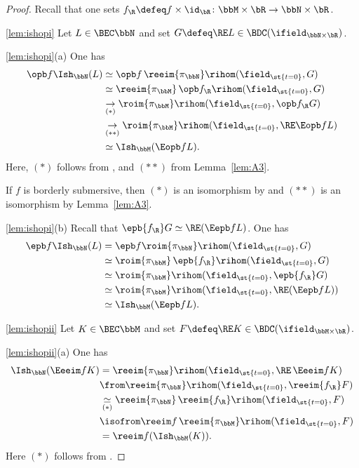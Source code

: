 \begin{proof}
Recall that one sets $f_\R \defeq f\times\id_\bR\colon \bbM\times\bR\to \bbN\times\bR$.

\eqref{lem:ishopi} Let $L\in\BEC\bbN$ and set $G\defeq\RE L\in\BDC(\ifield_{\bbN\times\bR})$.

\eqref{lem:ishopi}(a) One has
\begin{align*}
\opb f \Ish_{\bbN}(L)
&\simeq \opb f \,\reeim{{\pi_\bbN}} \rihom(\field_{\st{t=0}},G) \\
&\simeq\reeim{{\pi_\bbM}} \,\opb f_\R \rihom(\field_{\st{t=0}},G) \\
&\underset{(*)}\to \roim{{\pi_\bbM}} \rihom(\field_{\st{t=0}},\opb f_\R G) \\
&\underset{(**)}\to \roim{{\pi_\bbM}} \rihom(\field_{\st{t=0}},\RE\Eopb f L) \\
&\simeq \Ish_{\bbM}(\Eopb f L).
\end{align*}
Here, $(*)$ follows from \cite[Prop.\,3.3.13]{DK16},
and $(**)$ from Lemma~\ref{lem:A3}.

If $f$ is borderly submersive,
then $(*)$ is an isomorphism by \cite[Prop.\,3.3.19]{DK16}
and $(**)$ is an isomorphism by Lemma~\ref{lem:A3}.

\eqref{lem:ishopi}(b) Recall that $\epb{f_\R}G \simeq \RE(\Eepb f L)$. One has
\begin{align*}
\epb f \Ish_{\bbN}(L)
&= \epb f \roim{{\pi_\bbN}} \rihom(\field_{\st{t=0}},G) \\
&\simeq \roim{{\pi_\bbM}}\, \epb{f_\R} \rihom(\field_{\st{t=0}},G) \\
&\simeq \roim{{\pi_\bbM}} \rihom(\field_{\st{t=0}},\epb{f_\R} G) \\
&\simeq \roim{{\pi_\bbM}} \rihom(\field_{\st{t=0}},\RE(\Eepb f L)) \\
&\simeq \Ish_{\bbM} (\Eepb f L).
\end{align*}

\eqref{lem:ishopii}
Let $K\in\BEC\bbM$ and set $F\defeq\RE K\in\BDC(\ifield_{\bbM\times\bR})$.

\eqref{lem:ishopii}(a)
One has
\begin{align*}
\Ish_{\bbN}(\Eeeim f K)
&=\reeim{{\pi_\bbN}} \rihom(\field_{\st{t=0}}, \RE\,\Eeeim f K) \\
&\from \reeim{{\pi_\bbN}} \rihom(\field_{\st{t=0}}, \reeim{{f_\R}}F) \\
&\underset{(*)}\simeq \reeim{{\pi_\bbN}}\, \reeim{{f_\R}}\rihom(\field_{\st{t=0}}, F) \\
&\isofrom \reeim f\,\reeim{{\pi_\bbM}} \rihom(\field_{\st{t=0}}, F) \\
&= \reeim f (\Ish_{\bbM}(K)).
\end{align*}
Here $(*)$ follows from \cite[Lem.\,5.2.8]{KS01}.


\end{proof}
